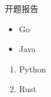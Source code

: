 \documentclass{article}
\begin{document}
\begin{CJK*}{UTF8}{gbsn}
开题报告
\begin{itemize}
  \item Go
  \item Java
\end{itemize}
\begin{enumerate}
  \item Python
  \item Rust
\end{enumerate}
\clearpage\end{CJK*}
\end{document}
